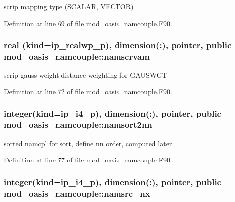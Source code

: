 scrip mapping type (S\+C\+A\+L\+A\+R, V\+E\+C\+T\+O\+R) 



Definition at line 69 of file mod\+\_\+oasis\+\_\+namcouple.\+F90.

\hypertarget{classmod__oasis__namcouple_a45b410743ce74a9824d44b329ba323ba}{
\subsubsection[{namscrvam}]{\setlength{\rightskip}{0pt plus 5cm}real (kind=ip\+\_\+realwp\+\_\+p), dimension(\+:), pointer, public mod\+\_\+oasis\+\_\+namcouple\+::namscrvam}}\label{classmod__oasis__namcouple_a45b410743ce74a9824d44b329ba323ba}


scrip gauss weight distance weighting for G\+A\+U\+S\+W\+G\+T 



Definition at line 72 of file mod\+\_\+oasis\+\_\+namcouple.\+F90.

\hypertarget{classmod__oasis__namcouple_a4555b14f38928b7f0fb7f77b9c42d0a0}{
\subsubsection[{namsort2nn}]{\setlength{\rightskip}{0pt plus 5cm}integer(kind=ip\+\_\+i4\+\_\+p), dimension(\+:), pointer, public mod\+\_\+oasis\+\_\+namcouple\+::namsort2nn}}\label{classmod__oasis__namcouple_a4555b14f38928b7f0fb7f77b9c42d0a0}


sorted namcpl for sort, define nn order, computed later 



Definition at line 77 of file mod\+\_\+oasis\+\_\+namcouple.\+F90.

\hypertarget{classmod__oasis__namcouple_ac8f6c8fe3720739f3d26431a8a600506}{
\subsubsection[{namsrc\+\_\+nx}]{\setlength{\rightskip}{0pt plus 5cm}integer(kind=ip\+\_\+i4\+\_\+p), dimension(\+:), pointer, public mod\+\_\+oasis\+\_\+namcouple\+::namsrc\+\_\+nx}}\label{classmod__oasis__namcouple_ac8f6c8fe3720739f3d26431a8a600506}


